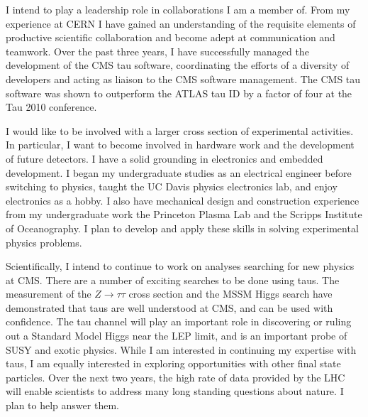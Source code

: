 \documentclass{scrartcl}        %
\begin{document}
\begin{cv}{}
I intend to play a leadership role in collaborations I am a member of. From my
experience at CERN I have gained an understanding of the requisite elements of
productive scientific collaboration and become adept at communication and
teamwork. Over the past three years, I have successfully managed the
development of the CMS tau software, coordinating the efforts of a diversity of
developers and acting as liaison to the CMS software management.  The CMS tau
software was shown to outperform the ATLAS tau ID by a factor of four at the Tau
2010 conference. 

I would like to be involved with a larger cross section of experimental
activities.  In particular, I want to become involved in hardware work and the
development of future detectors. I have a solid grounding in electronics and
embedded development. I began my undergraduate studies as an electrical engineer
before switching to physics, taught the UC Davis physics electronics lab, and
enjoy electronics as a hobby.  I also have mechanical design and construction
experience from my undergraduate work the Princeton Plasma Lab and the Scripps
Institute of Oceanography. I plan to develop and apply these skills in solving
experimental physics problems.



Scientifically, I intend to continue to work on analyses searching for new
physics at CMS\@.  There are a number of exciting searches to be done 
using taus.  The measurement of the $Z\to\tau\tau$ cross section and the MSSM
Higgs search have demonstrated that taus are well understood at CMS, and can
be used with confidence.  The tau channel will play an important role in
discovering or ruling out a Standard Model Higgs near the LEP limit, and is an
important probe of SUSY and exotic physics. While I am interested in continuing
my expertise with taus, I am equally interested in exploring opportunities with
other final state particles.  Over the next two years, the high rate of data
provided by the LHC will enable scientists to address many long standing
questions about nature. I plan to help answer them. 

\end{cv}
\end{document}
